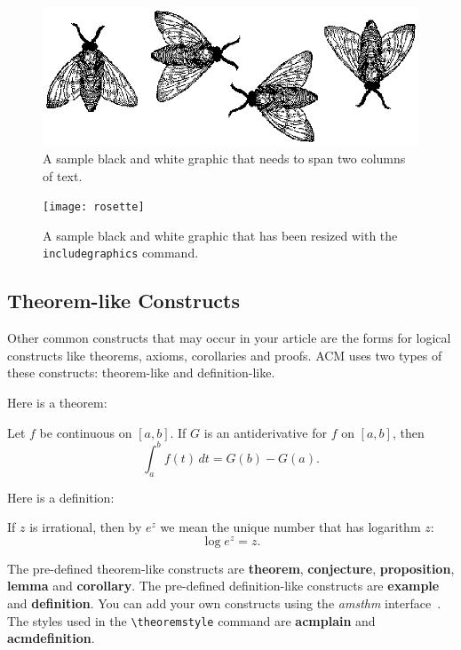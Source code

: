 \begin{figure}
	\includegraphics{flies}
	\caption{A sample black and white graphic
		that needs to span two columns of text.}
\end{figure}


\begin{figure}
	\texttt{[image: rosette]}
	\caption{A sample black and white graphic that has
		been resized with the \texttt{includegraphics} command.}
\end{figure}

\subsection{Theorem-like Constructs}

Other common constructs that may occur in your article are the forms
for logical constructs like theorems, axioms, corollaries and proofs.
ACM uses two types of these constructs:  theorem-like and
definition-like.

Here is a theorem:
\begin{theorem}
	Let $f$ be continuous on $[a,b]$.  If $G$ is
	an antiderivative for $f$ on $[a,b]$, then
	\begin{displaymath}
	\int^b_af(t)\,dt = G(b) - G(a).
	\end{displaymath}
\end{theorem}

Here is a definition:
\begin{definition}
	If $z$ is irrational, then by $e^z$ we mean the
	unique number that has
	logarithm $z$:
	\begin{displaymath}
	\log e^z = z.
	\end{displaymath}
\end{definition}

The pre-defined theorem-like constructs are \textbf{theorem},
\textbf{conjecture}, \textbf{proposition}, \textbf{lemma} and
\textbf{corollary}.  The pre-defined de\-fi\-ni\-ti\-on-like constructs are
\textbf{example} and \textbf{definition}.  You can add your own
constructs using the \textsl{amsthm} interface~\cite{Amsthm15}.  The
styles used in the \verb|\theoremstyle| command are \textbf{acmplain}
and \textbf{acmdefinition}.

